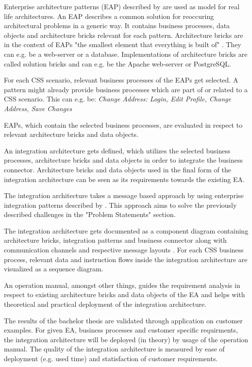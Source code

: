 \documentclass{article}
\begin{document}
Enterprise architecture patterns (EAP) described by \cite{architecturePatterns} are used as model for
real life architectures. An EAP describes a common solution for reoccuring architectural problems in a 
generic way. It contains business processes, data objects and architecture bricks relevant for each pattern.
Architecture bricks are in the context of EAPs "the smallest element that everything is built of" 
\cite[Page 21]{architecturePatterns}. They can e.g. be a web-server or a database. Implementations of 
architecture bricks are called solution bricks and can e.g. be the Apache web-server or PostgreSQL.

For each CSS scenario, relevant business processes of the EAPs get selected. A pattern might already
provide business processes which are part of or related to a CSS scenario.
This can e.g. be: \textit{Change Address: Login, Edit Profile, Change Address, Save Changes}

EAPs, which contain the selected business processes, are evaluated in respect to relevant architecture 
bricks and data objects.

An integration architecture gets defined, which utilizes the selected business processes, architecture 
bricks and data objects in order to integrate the business connector. Architecture bricks and data objects 
used in the final form of the integration architecture can be seen as its requirements towards the existing EA.

The integration architecture takes a message based approach by using enterprise integration patterns described
by \cite{integrationPatterns}. This approach aims to solve the previously described challenges in the 
"Problem Statements" section.

The integration architecture gets documented as a component diagram
containing architecture bricks, integration patterns and business connector along with communication 
channels and respective message layouts \cite[cf. 16 ff.]{integrationPatterns}.
For each CSS business process, relevant data and instruction flows inside the integration architecture 
are visualized as a sequence diagram.

An operation manual, 
amongst other things, guides the requirement analysis in respect to existing architecture bricks and data 
objects of the EA and helps with theoretical and practical deployment of the integration architecture.

The results of the bachelor thesis are validated through application on customer examples. For given 
EA, business processes and customer specific requirments, the integration architecture will be 
deployed (in theory) by usage of the operation manual.
The quality of the integration architecture is measured by ease of deployment (e.g. used time) and 
statisfaction of customer requirements.
\end{document}

